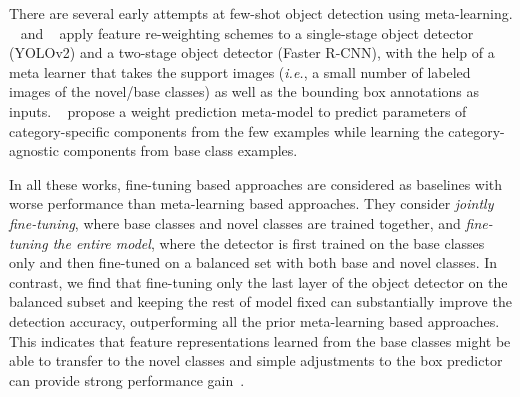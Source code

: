  There are several early attempts 
at few-shot object detection using meta-learning. ~\citet{kang2019few} and 
~\citet{yan2019meta} apply feature re-weighting schemes to a
single-stage object detector (YOLOv2) and a two-stage object detector
(Faster R-CNN), with the help of a meta learner that takes the support images (\textit{i.e.}, a small number of labeled images of the novel/base classes) 
as well as the bounding box annotations as inputs. ~\citet{wang2019meta} 
propose a weight prediction meta-model to predict parameters of
category-specific components from the few examples while learning the category-agnostic components from base class examples. 

In all these works, fine-tuning based approaches are considered as baselines
with worse performance than meta-learning based approaches. They consider
\emph{jointly fine-tuning}, where base classes and novel classes are trained together, and \emph{fine-tuning the entire model}, where the detector is first trained on the base classes only and then fine-tuned on a balanced set with both base and novel classes. In contrast, we find that fine-tuning only the last layer of the object detector on the balanced subset and keeping the rest of model fixed can substantially improve the
detection accuracy, outperforming all the prior meta-learning based
approaches. This indicates that feature representations
learned from the base classes might be able to transfer to the novel classes
and simple adjustments to the box predictor can provide 
strong performance gain~\cite{dhillon2019baseline}. 


